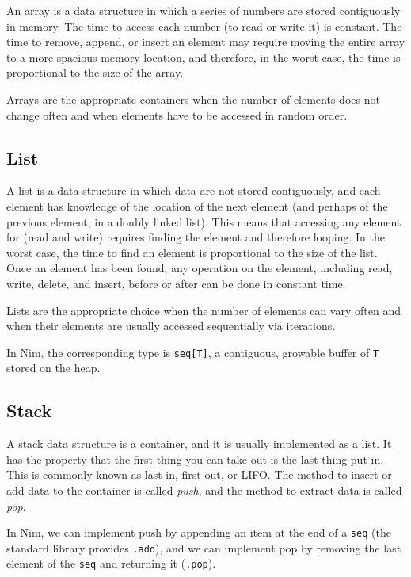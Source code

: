 \documentclass[justified, sixbynine]{tufte-book}
\def\ft{\small\tt}
\theoremstyle{plain}%
\newtheorem * {corollary}{Corollary}
\theoremstyle{definition}
\theoremstyle{remark}
\newtheorem * {remark}{Remark}
\newtheorem * {note}{Note}
\begin{document}
\begin{fullwidth}
An array is a data structure in which a series of numbers are stored contiguously in memory. The time to access each number (to read or write it) is constant. The time to remove, append, or insert an element may require moving the entire array to a more spacious memory location, and therefore, in the worst case, the time is proportional to the size of the array.

Arrays are the appropriate containers when the number of elements does not change often and when elements have to be accessed in random order.

\goodbreak\subsection{List}

A list is a data structure in which data are not stored contiguously, and each element has knowledge of the location of the next element (and perhaps of the previous element, in a doubly linked list). This means that accessing any element for (read and write) requires finding the element and therefore looping. In the worst case, the time to find an element is proportional to the size of the list. Once an element has been found, any operation on the element, including read, write, delete, and insert, before or after can be done in constant time.

Lists are the appropriate choice when the number of elements can vary often and when their elements are usually accessed sequentially via iterations.

In Nim, the corresponding type is {\ft seq[T]}, a contiguous, growable buffer of {\ft T} stored on the heap.

\goodbreak\subsection{Stack}


A stack data structure is a container, and it is usually implemented as a list. It has the property that the first thing you can take out is the last thing put in. This is commonly known as last-in, first-out, or LIFO. The method to insert or add data to the container is called {\it push}, and the method to extract data is called {\it pop}.

In Nim, we can implement push by appending an item at the end of a {\ft seq} (the standard library provides {\ft .add}), and we can implement pop by removing the last element of the {\ft seq} and returning it ({\ft .pop}).


\end{fullwidth}
\end{document}

